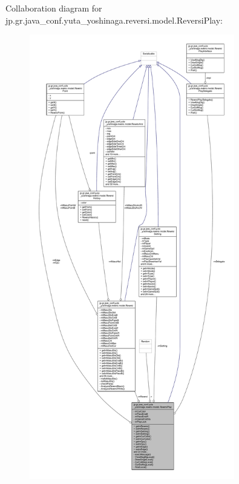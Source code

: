 Collaboration diagram for jp.\+gr.\+java\+\_\+conf.\+yuta\+\_\+yoshinaga.\+reversi.\+model.\+Reversi\+Play\+:\nopagebreak
\begin{figure}[H]
\begin{center}
\leavevmode
\includegraphics[height=550pt]{classjp_1_1gr_1_1java__conf_1_1yuta__yoshinaga_1_1reversi_1_1model_1_1_reversi_play__coll__graph}
\end{center}
\end{figure}
